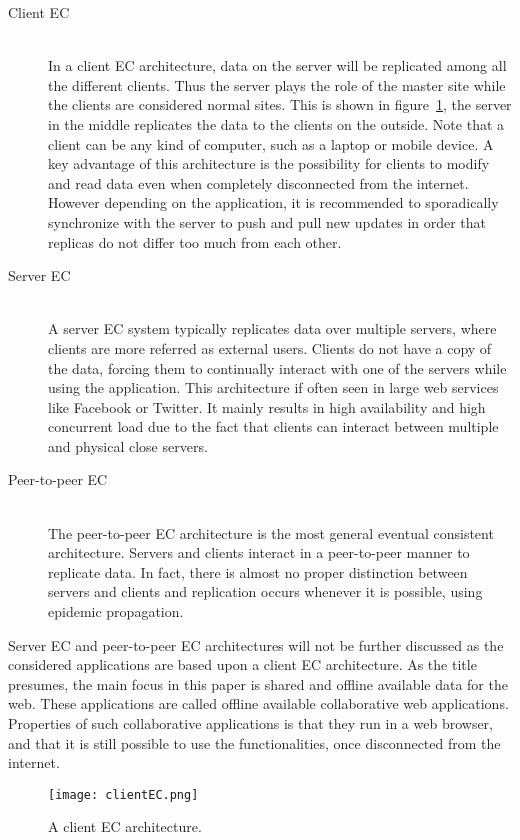 \documentclass[a4paper,12pt]{report}
\begin{document}
\begin{description}
    \item[Client EC] \hfill \\ In a client EC architecture, data on the server will be replicated among all the different clients. Thus the server plays the role of the master site while the clients are considered normal sites. This is shown in figure~\ref{fig:clientEC}, the server in the middle replicates the data to the clients on the outside. Note that a client can be any kind of computer, such as a laptop or mobile device. A key advantage of this architecture is the possibility for clients to modify and read data even when completely disconnected from the internet. However depending on the application, it is recommended to sporadically synchronize with the server to push and pull new updates in order that replicas do not differ too much from each other. 
    \item[Server EC] \hfill \\ A server EC system typically replicates data over multiple servers, where clients are more referred as external users. Clients do not have a copy of the data, forcing them to continually interact with one of the servers while using the application. This architecture if often seen in large web services like Facebook or Twitter. It mainly results in high availability and high concurrent load due to the fact that clients can interact between multiple and physical close servers.
    \item[Peer-to-peer EC] \hfill \\ The peer-to-peer EC architecture is the most general eventual consistent architecture. Servers and clients interact in a peer-to-peer manner to replicate data. In fact, there is almost no proper distinction between servers and clients and replication occurs whenever it is possible, using epidemic propagation.
\end{description}

Server EC and peer-to-peer EC architectures will not be further discussed as the considered applications are based upon a client EC architecture. As the title presumes, the main focus in this paper is shared and offline available data for the web. These applications are called offline available collaborative web applications. Properties of such collaborative applications is that they run in a web browser, and that it is still possible to use the functionalities, once disconnected from the internet. 

\begin{figure}
    \small
    \centering
    \texttt{[image: clientEC.png]}
    \caption{A client EC architecture.}
    \label{fig:clientEC}
\end{figure}
\end{document}
